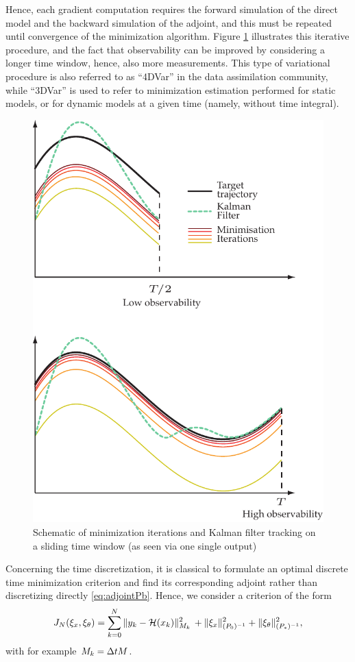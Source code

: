 Hence, each gradient computation requires the forward simulation of the direct model and the backward simulation of the adjoint, and this must be repeated until convergence of the minimization algorithm. Figure \ref{fig:variat} illustrates this iterative procedure, and the fact that observability can be improved by considering a longer time window, hence, also more measurements. This type of variational procedure is also referred to as ``4DVar'' in the data assimilation community, while ``3DVar'' is used to refer to minimization estimation performed for static models, or for dynamic models at a given time (namely, without time integral).

\begin{figure}[htbp]
\begin{center}
\includegraphics[width=.5\textwidth]{figure/seqVSvaria.pdf}
\caption{Schematic of minimization iterations and Kalman filter tracking on a sliding time window (as seen via one single output)}
\label{fig:variat}
\end{center}
\end{figure}

Concerning the time discretization, it is classical to formulate an optimal discrete time minimization criterion and find its corresponding adjoint rather than discretizing directly \eqref{eq:adjointPb}. Hence, we consider a criterion of the form
\begin{equation}\label{eq:varCriterionTimeDisc}
	J_N(\xi_x,\xi_{\theta}) = \sum_{k=0}^N \|y_k-\mathcal{H}(x_k)\|_{M_k}^2 \,  + \|\xi_x\|_{(P_{0})^{-1}}^2 + \|\xi_{\theta}\|_{({P}_{*})^{-1}}^2,
\end{equation}
with for example $M_k = \Delta t M$.


